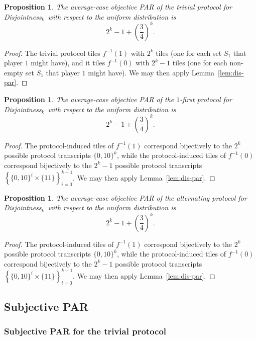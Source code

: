 \documentclass{article}
\theoremstyle{theorem}
\newtheorem{prop}[theorem]{Proposition}
\theoremstyle{definition}
\theoremstyle{remark}
\newcommand{\disjoint}{{\sc Dis\-joint\-ness}\ensuremath{_k}}
\begin{document}
\begin{prop}
The average-case objective PAR of the trivial protocol for \disjoint\ with respect to the uniform distribution is
\[
2^k -1 + \left(\frac{3}{4}\right)^k.
\]
\end{prop}
\begin{proof}
The trivial protocol tiles $f^{-1}(1)$ with $2^k$ tiles (one for each set $S_1$ that player $1$ might have), and it tiles $f^{-1}(0)$ with $2^k - 1$ tiles (one for each non-empty set $S_1$ that player $1$ might have).  We may then apply Lemma~\ref{lem:dis-par}.
\end{proof}

\begin{prop}
The average-case objective PAR of the $1$-first protocol for \disjoint\ with respect to the uniform distribution is
\[
2^k -1 + \left(\frac{3}{4}\right)^k.
\]
\end{prop}
\begin{proof}
The protocol-induced tiles of $f^{-1}(1)$ correspond bijectively to the $2^k$ possible protocol transcripts $\{0,10\}^k$, while the protocol-induced tiles of $f^{-1}(0)$ correspond bijectively to the $2^k - 1$ possible protocol transcripts $\left\{\{0,10\}^i\times \{11\}\right\}_{i=0}^{k-1}$.  We may then apply Lemma~\ref{lem:dis-par}.
\end{proof}

\begin{prop}
The average-case objective PAR of the alternating protocol for \disjoint\ with respect to the uniform distribution is
\[
2^k -1 + \left(\frac{3}{4}\right)^k.
\]
\end{prop}
\begin{proof}
The protocol-induced tiles of $f^{-1}(1)$ correspond bijectively to the $2^k$ possible protocol transcripts $\{0,10\}^k$, while the protocol-induced tiles of $f^{-1}(0)$ correspond bijectively to the $2^k - 1$ possible protocol transcripts $\left\{\{0,10\}^i\times \{11\}\right\}_{i=0}^{k-1}$.  We may then apply Lemma~\ref{lem:dis-par}.
\end{proof}

\subsection{Subjective PAR}

\subsubsection{Subjective PAR for the trivial protocol}
\end{document}
